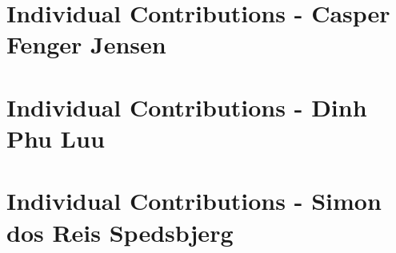 









\newpage




\newpage

\section{Individual Contributions - Casper Fenger Jensen}



\newpage

\section{Individual Contributions - Dinh Phu Luu}



\newpage

\section{Individual Contributions - Simon dos Reis Spedsbjerg}

